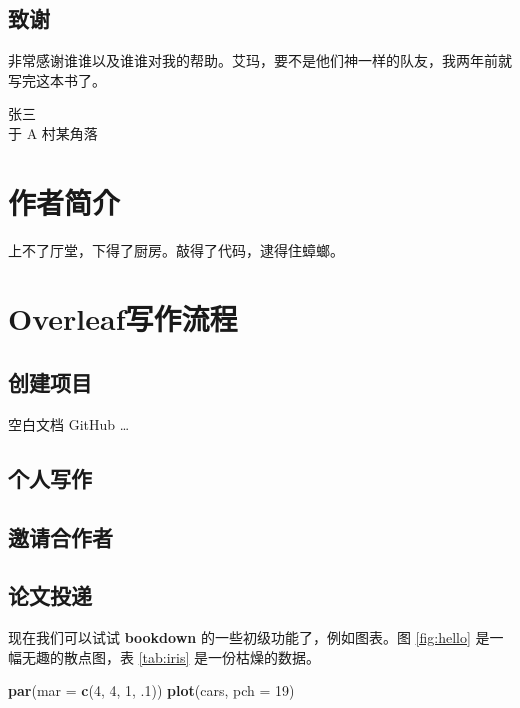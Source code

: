 \documentclass[]{ctexbook}
\newenvironment{Shaded}{\begin{snugshade}}{\end{snugshade}}
\newcommand{\DataTypeTok}[1]{\textcolor[rgb]{0.13,0.29,0.53}{#1}}
\newcommand{\DecValTok}[1]{\textcolor[rgb]{0.00,0.00,0.81}{#1}}
\newcommand{\FloatTok}[1]{\textcolor[rgb]{0.00,0.00,0.81}{#1}}
\newcommand{\KeywordTok}[1]{\textcolor[rgb]{0.13,0.29,0.53}{\textbf{#1}}}
\newcommand{\NormalTok}[1]{#1}
\let\BeginKnitrBlock\begin \let\EndKnitrBlock\end
\begin{document}
\hypertarget{section-1}{%
\section*{致谢}\label{section-1}}


非常感谢谁谁以及谁谁对我的帮助。艾玛，要不是他们神一样的队友，我两年前就写完这本书了。

\BeginKnitrBlock{flushright}
张三\\
于 A 村某角落
\EndKnitrBlock{flushright}

\hypertarget{author}{%
\chapter*{作者简介}\label{author}}


上不了厅堂，下得了厨房。敲得了代码，逮得住蟑螂。

\mainmatter

\hypertarget{intro}{%
\chapter{Overleaf写作流程}\label{intro}}

\hypertarget{section-2}{%
\section{创建项目}\label{section-2}}

空白文档
GitHub
\ldots{}

\hypertarget{section-3}{%
\section{个人写作}\label{section-3}}

\hypertarget{section-4}{%
\section{邀请合作者}\label{section-4}}

\hypertarget{section-5}{%
\section{论文投递}\label{section-5}}

现在我们可以试试 \textbf{bookdown} 的一些初级功能了，例如图表。图 \ref{fig:hello} 是一幅无趣的散点图，表 \ref{tab:iris} 是一份枯燥的数据。

\begin{Shaded}
\begin{Highlighting}[]
\KeywordTok{par}\NormalTok{(}\DataTypeTok{mar =} \KeywordTok{c}\NormalTok{(}\DecValTok{4}\NormalTok{, }\DecValTok{4}\NormalTok{, }\DecValTok{1}\NormalTok{, }\FloatTok{.1}\NormalTok{))}
\KeywordTok{plot}\NormalTok{(cars, }\DataTypeTok{pch =} \DecValTok{19}\NormalTok{)}
\end{Highlighting}
\end{Shaded}
\end{document}
